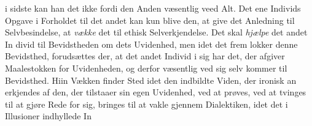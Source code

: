 \documentclass[12pt,a4paper]{book}
\begin{document}
i sidste kan han det ikke fordi den Anden væsentlig veed Alt.
Det ene Individs Opgave i Forholdet til det andet kan kun
blive den, at give det Anledning til Selvbesindelse, at \emph{vække}
det til ethisk Selverkjendelse. Det skal \emph{hjælpe} det andet In\-%
divid til Bevidstheden om dets Uvidenhed, men idet det frem\-%
lokker denne Bevidsthed, forudsættes der, at det andet Individ
i sig har det, der afgiver Maalestokken for Uvidenheden, og
derfor væsentlig ved sig selv kommer til Bevidsthed. Hiin
Vækken finder Sted idet den indbildte Viden, der ironisk an\-%
erkjendes af den, der tilstaaer sin egen Uvidenhed, ved at
prøves, ved at tvinges til at gjøre Rede for sig, bringes til at
vakle gjennem Dialektiken, idet det i Illusioner indhyllede In\-%
\setcounter{footnote}{0}%
\end{document}
